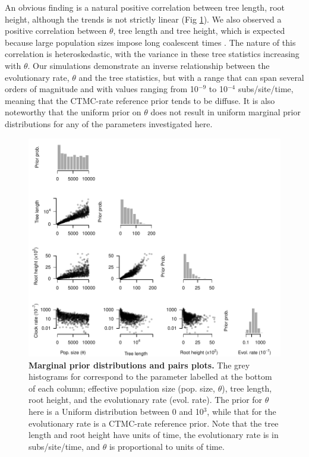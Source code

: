 \documentclass[10pt,letterpaper]{article}
\begin{document}
An obvious finding is a natural positive correlation between tree length, root height, although the trends is not strictly linear (Fig \ref{figure:correlation_plots}). We also observed a positive correlation between $\theta$, tree length and tree height, which is expected because large population sizes impose long coalescent times \cite{rosenberg2002genealogical}. The nature of this correlation is heteroskedastic, with the variance in these tree statistics increasing with $\theta$. Our simulations demonstrate an inverse relationship between the evolutionary rate, $\theta$ and the tree statistics, but with a range that can span several orders of magnitude and with values ranging from 10$^{-9}$ to 10$^{-4}$ subs/site/time, meaning that the CTMC-rate reference prior tends to be diffuse. It is also noteworthy that the uniform prior on $\theta$ does not result in uniform marginal prior distributions for any of the parameters investigated here.

\begin{figure}[!h]
		\begin{center}
		\includegraphics[width=14.7cm]{sandbox_figures/prior_predictive_plots.pdf}\newline
		\vspace{-0.5cm}
		\caption{\textbf{Marginal prior distributions and pairs plots.} The grey histograms for correspond to the parameter labelled at the bottom of each column; effective population size (pop. size, $\theta$), tree length, root height, and the evolutionary rate (evol. rate). The prior for $\theta$ here is a Uniform distribution between 0 and 10$^3$, while that for the evolutionary rate is a CTMC-rate reference prior. Note that the tree length and root height have units of time, the evolutionary rate is in subs/site/time, and $\theta$ is proportional to units of time. }
		\end{center}
	\label{figure:correlation_plots}
\end{figure}
\end{document}
